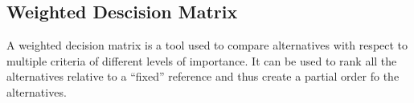 \documentclass[12pt,a4paper]{article}
\begin{document}
\begin{table}
\end{table}


\newpage



\subsection{Weighted Descision Matrix}

A weighted decision matrix is a tool used to compare alternatives with respect to multiple criteria of different levels of importance. It can be used to rank all the alternatives relative to a “fixed” reference and thus create a partial order fo the alternatives.\cite{weighted-decision-matrix:2018}
\end{document}
